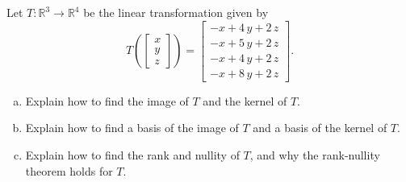 
\begin{exerciseStatement}
 Let \(T:\mathbb{R}^ 3  \to \mathbb{R}^ 4 \) be the linear transformation given by \[T\left(  \left[\begin{array}{c}
x \\
y \\
z
\end{array}\right]  \right) =  \left[\begin{array}{c}
-x + 4 \, y + 2 \, z \\
-x + 5 \, y + 2 \, z \\
-x + 4 \, y + 2 \, z \\
-x + 8 \, y + 2 \, z
\end{array}\right] .\]
\begin{enumerate}[(a)]
\item Explain how to find the image of \(T\) and the kernel of \(T\).
\item Explain how to find a basis of the image of \(T\) and a basis of the kernel of \(T\).
\item Explain how to find the rank and nullity of \(T\), and why the rank-nullity theorem holds for \(T\).
\end{enumerate}
    
\end{exerciseStatement}
    
